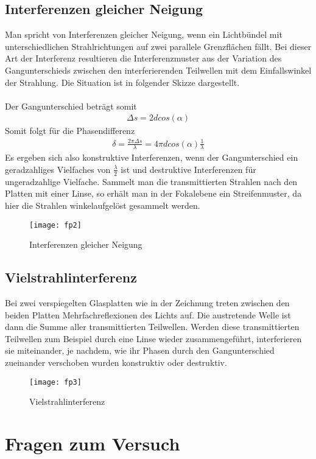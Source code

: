 \documentclass[a4paper,10pt]{scrartcl}
\begin{document}
	\subsection{Interferenzen gleicher Neigung}
	Man spricht von Interferenzen gleicher Neigung, wenn ein Lichtbündel mit unterschiedlichen Strahlrichtungen
	auf zwei parallele Grenzflächen fällt. Bei dieser Art der Interferenz resultieren die Interferenzmuster aus der Variation
	des Gangunterschieds zwischen den interferierenden Teilwellen mit dem Einfallswinkel der Strahlung. Die Situation ist in folgender Skizze dargestellt.\\
	\\
	Der Gangunterschied beträgt somit
	\begin{align*}
	\Delta s=2dcos(\alpha)
	\end{align*}
	Somit folgt für die Phasendifferenz
	\begin{align*}
	\delta=\frac{2\pi \Delta s}{\lambda}=4\pi d cos(\alpha)\frac{1}{\lambda}
	\end{align*}
	Es ergeben sich also konstruktive Interferenzen, wenn der Gangunterschied ein geradzahliges Vielfaches von \(\frac{\lambda}{2}\) ist und destruktive Interferenzen für ungeradzahlige Vielfache.
	Sammelt man die transmittierten Strahlen nach den Platten mit einer Linse, so erhält man in der
Fokalebene ein Streifenmuster, da hier die Strahlen winkelaufgelöst gesammelt werden.
	\begin{figure}[h]
\centering
\texttt{[image: fp2]}
\caption{Interferenzen gleicher Neigung}
\end{figure}
\FloatBarrier
	
	\subsection{Vielstrahlinterferenz}
	Bei zwei verspiegelten Glasplatten wie in der Zeichnung treten zwischen den beiden Platten Mehrfachreflexionen des Lichts auf. Die austretende Welle ist dann die Summe aller transmittierten Teilwellen. Werden diese transmittierten Teilwellen zum Beispiel durch eine Linse wieder zusammengeführt, interferieren sie miteinander, je nachdem, wie ihr Phasen durch den Gangunterschied zueinander verschoben wurden konstruktiv oder destruktiv.
	\begin{figure}[h]
\centering
\texttt{[image: fp3]}
\caption{Vielstrahlinterferenz}
\end{figure}
\FloatBarrier
	
	\section{Fragen zum Versuch}
\end{document}
